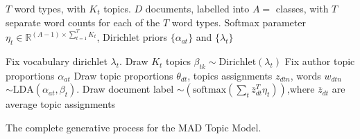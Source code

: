 \documentclass[14pt]{article} %
\theoremstyle{plain}
\theoremstyle{definition}
\theoremstyle{remark}
\begin{document}
\begin{algorithm}
\begin{algorithmic}[1]
 \State $T$ word types, with $K_t$ topics. $D$ documents, labelled into $A=$ classes, with $T$ separate word counts for each of the $T$ word types. Softmax parameter $\eta_t \in \mathbb{R}^{(A-1)\times\sum_{t=1}^TK_t}$, Dirichlet priors $\{\alpha_{at}\}$ and $\{\lambda_t\}$
 	
 	\State Fix vocabulary dirichlet $\lambda_t$. Draw $K_t$ topics $\beta_{tk}\sim \text{Dirichlet}(\lambda_{t})$
 \EndFor
 	 	\State Fix author topic proportions $\alpha_{at}$
 	\EndFor
		\State Draw topic proportions $\theta_{dt}$, topics assignments $z_{dtn}$, words $w_{dtn}$ $\sim\text{LDA}(\alpha_{at},\beta_t)$.
 		\State Draw document label $\sim(\text{softmax}(\sum_{t}\overline{z}_{dt}^T\eta_t))$,where $\overline{z}_{dt}$ are average topic assignments
 	\EndFor
\EndFor
\EndProcedure
\end{algorithmic}
\caption{The complete generative process for the MAD Topic Model.}
\label{fig:mad}
\end{algorithm}

\clearpage




\newpage
\end{document}

